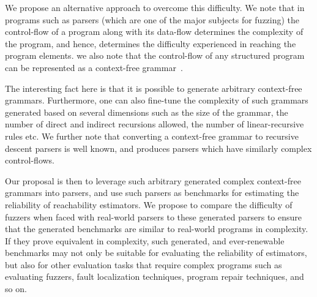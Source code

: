 \documentclass[conference]{IEEEtran}
\begin{document}
We propose an alternative approach to overcome this difficulty. We note that
in programs such as parsers (which are one of the major subjects for fuzzing)
the control-flow of a program along with its data-flow determines the
complexity of the program, and hence, determines the difficulty
experienced in reaching the program elements. we also note that the
control-flow of any structured program can be represented as a context-free
grammar~.

The interesting fact here is that it is possible to generate arbitrary
context-free grammars. Furthermore, one can also fine-tune the complexity
of such grammars generated based on several dimensions such as the size
of the grammar, the number of direct and indirect recursions allowed, the
number of linear-recursive rules etc.
We further note that converting a context-free grammar to recursive descent
parsers is well known, and produces parsers which have similarly complex
control-flows.

Our proposal is then to leverage such arbitrary generated complex
context-free grammars into parsers, and use such parsers as benchmarks for
estimating the reliability of reachability estimators. We propose to compare
the difficulty of fuzzers when faced with real-world parsers to these
generated parsers to ensure that the generated benchmarks are similar to
real-world programs in complexity. If they prove equivalent in complexity,
such generated, and ever-renewable benchmarks may not only be suitable for
evaluating the reliability of estimators, but also for other evaluation
tasks that require complex programs such as evaluating fuzzers,
fault localization techniques, program repair techniques, and so on.
\end{document}

